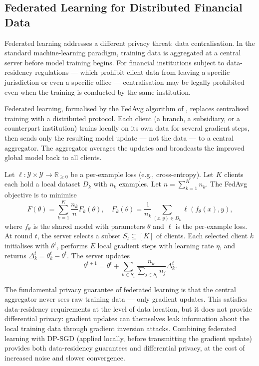 \subsection{Federated Learning for Distributed Financial Data}
\label{sec:ch15-federated}

Federated learning addresses a different privacy threat: data centralisation. In the standard machine-learning paradigm, training data is aggregated at a central server before model training begins. For financial institutions subject to data-residency regulations — which prohibit client data from leaving a specific jurisdiction or even a specific office — centralisation may be legally prohibited even when the training is conducted by the same institution.

Federated learning, formalised by the FedAvg algorithm of \citet{mcmahan2017communication}, replaces centralised training with a distributed protocol. Each client (a branch, a subsidiary, or a counterpart institution) trains locally on its own data for several gradient steps, then sends only the resulting model update — not the data — to a central aggregator. The aggregator averages the updates and broadcasts the improved global model back to all clients.

\begin{definition}
\label{def:fedavg}
Let $\ell: \mathcal{Y} \times \mathcal{Y} \to \mathbb{R}_{\geq 0}$ be a per-example loss (e.g., cross-entropy). Let $K$ clients each hold a local dataset $D_k$ with $n_k$ examples. Let $n = \sum_{k=1}^K n_k$. The FedAvg objective is to minimise
\begin{equation}
  \label{eq:ch15-fedavg-obj}
  F(\theta) = \sum_{k=1}^K \frac{n_k}{n} F_k(\theta),
  \quad F_k(\theta) = \frac{1}{n_k} \sum_{(x,y) \in D_k} \ell(f_\theta(x), y),
\end{equation}
where $f_\theta$ is the shared model with parameters $\theta$ and $\ell$ is the per-example loss. At round $t$, the server selects a subset $S_t \subseteq [K]$ of clients. Each selected client $k$ initialises with $\theta^t$, performs $E$ local gradient steps with learning rate $\eta$, and returns $\Delta_k^t = \theta_k^t - \theta^t$. The server updates
\begin{equation}
  \label{eq:ch15-fedavg-update}
  \theta^{t+1} = \theta^t + \sum_{k \in S_t} \frac{n_k}{\sum_{j \in S_t} n_j} \Delta_k^t.
\end{equation}
\end{definition}

The fundamental privacy guarantee of federated learning is that the central aggregator never sees raw training data — only gradient updates. This satisfies data-residency requirements at the level of data location, but it does not provide differential privacy: gradient updates can themselves leak information about the local training data through gradient inversion attacks. Combining federated learning with DP-SGD (applied locally, before transmitting the gradient update) provides both data-residency guarantees and differential privacy, at the cost of increased noise and slower convergence.

